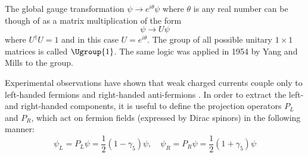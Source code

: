 The global gauge transformation $\psi\rightarrow e^{i\theta}\psi$ where $\theta$ is any real number can be though of as a matrix multiplication of the form
\begin{equation}
    \psi\rightarrow U\psi
\end{equation}
where $U^{\dag}U=1$ and in this case $U=e^{i\theta}$. The group of all possible unitary $1\times1$ matrices is called $\Ugroup{1}$. The same logic was applied in 1954 by Yang and Mills to the  group.


Experimental observations have shown that weak charged currents couple only to left-handed fermions and right-handed anti-fermions \cite{}. In order to extract the left- and right-handed components, it is useful to define the projection operators $P_L$ and $P_R$, which act on fermion fields (expressed by Dirac spinors) in the following manner:
\begin{equation}
    \psi_{L}=P_{L}\psi=\dfrac{1}{2}(1- \gamma_5)\psi,\quad 
    \psi_{R}=P_{R}\psi=\dfrac{1}{2}(1+ \gamma_5)\psi
\end{equation}

